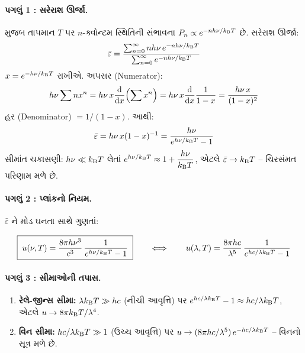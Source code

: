 \paragraph{પગલું 1 : સરેરાશ ઊર્જા.}  મુજબ તાપમાન $T$
પર $n$-ક્વોન્ટમ સ્થિતિની સંભાવના $P_n\propto e^{-n h\nu/k_{\mathrm{B}} T}$ છે. સરેરાશ ઊર્જા:
\begin{equation}
  \bar\varepsilon=\frac{\sum_{n=0}^{\infty} n h\nu\, e^{-nh\nu/k_{\mathrm{B}} T}}
                        {\sum_{n=0}^{\infty} e^{-nh\nu/k_{\mathrm{B}} T}}
\end{equation}
$x=e^{-h\nu/k_{\mathrm{B}} T}$ રાખીએ. અપસર (Numerator):
\begin{equation}
  h\nu\sum n x^n = h\nu\, x\frac{\mathrm{d}}{\mathrm{d}x}\Bigl(\sum x^n\Bigr)= h\nu\, x\frac{\mathrm{d}}{\mathrm{d}x}\frac{1}{1-x}=\frac{h\nu\,x}{(1-x)^2}
\end{equation}
હર (Denominator) $=1/(1-x)$. આથી:
\begin{equation}
  \bar\varepsilon=h\nu\,x(1-x)^{-1}=\frac{h\nu}{e^{h\nu/k_{\mathrm{B}} T}-1}
  \label{eq:planckavg}
\end{equation}
સીમાંત ચકાસણી: $h\nu\ll k_{\mathrm{B}} T$ લેતાં $e^{h\nu/k_{\mathrm{B}} T}\approx 1+\dfrac{h\nu}{k_{\mathrm{B}} T}$, એટલે
$\bar\varepsilon\to k_{\mathrm{B}} T$ -- ચિરસંમત પરિણામ મળે છે.

\paragraph{પગલું 2 : પ્લાંકનો નિયમ.} $\bar\varepsilon$ ને મોડ ઘનતા સાથે ગુણતાં:
\begin{niyam}[પ્લાંકનો વિકિરણ નિયમ]
\begin{equation}
  \boxed{\;u(\nu,T)=\frac{8\pi h\nu^{3}}{c^{3}}\,
  \frac{1}{e^{h\nu/k_{\mathrm{B}} T}-1}\;}
  \qquad\Longleftrightarrow\qquad
  u(\lambda,T)=\frac{8\pi hc}{\lambda^{5}}\,
  \frac{1}{e^{hc/\lambda k_{\mathrm{B}} T}-1}
\end{equation}
\end{niyam}

\paragraph{પગલું 3 : સીમાઓની તપાસ.}
\begin{enumerate}
  \item \textbf{રેલે-જીન્સ સીમા:} $\lambda k_{\mathrm{B}} T \gg hc$ (નીચી આવૃત્તિ) પર
        $e^{hc/\lambda k_{\mathrm{B}} T}-1\approx hc/\lambda k_{\mathrm{B}} T$, એટલે $u\to 8\pi k_{\mathrm{B}} T/\lambda^4$. \checkmark
  \item \textbf{વિન સીમા:} $hc/\lambda k_{\mathrm{B}} T\gg 1$ (ઉચ્ચ આવૃત્તિ) પર
        $u\to (8\pi hc/\lambda^{5})\,e^{-hc/\lambda k_{\mathrm{B}} T}$ -- વિનનો સૂત્ર મળે છે. \checkmark
\end{enumerate}

